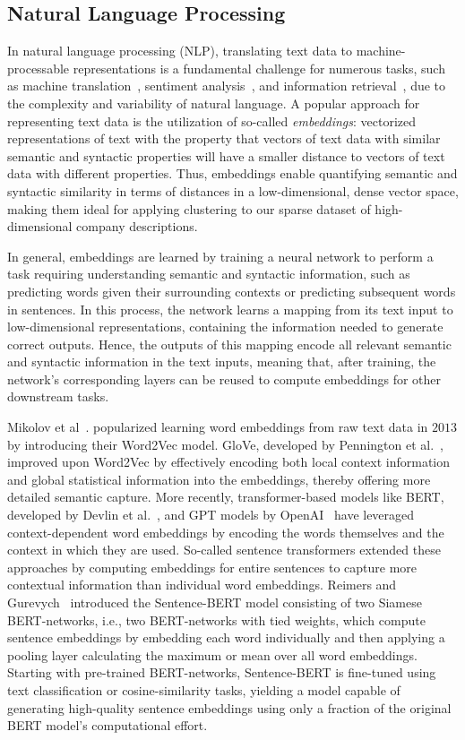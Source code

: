 \documentclass[conference]{IEEEtran}
\begin{document}
\subsection{Natural Language Processing}

In natural language processing (NLP), translating text data to machine-processable representations is a fundamental challenge for numerous tasks, such as machine translation~\cite{qi2018and}, sentiment analysis~\cite{rezaeinia2019sentiment}, and information retrieval~\cite{ye2016word}, due to the complexity and variability of natural language. A popular approach for representing text data is the utilization of so-called \emph{embeddings}: vectorized representations of text with the property that vectors of text data with similar semantic and syntactic properties will have a smaller distance to vectors of text data with different properties. Thus, embeddings enable quantifying semantic and syntactic similarity in terms of distances in a low-dimensional, dense vector space, making them ideal for applying clustering to our sparse dataset of high-dimensional company descriptions.  

In general, embeddings are learned by training a neural network to perform a task requiring understanding semantic and syntactic information, such as predicting words given their surrounding contexts or predicting subsequent words in sentences. In this process, the network learns a mapping from its text input to low-dimensional representations, containing the information needed to generate correct outputs. Hence, the outputs of this mapping encode all relevant semantic and syntactic information in the text inputs, meaning that, after training, the network's corresponding layers can be reused to compute embeddings for other downstream tasks.

Mikolov et al~\cite{mikolov2013efficient}. popularized learning word embeddings from raw text data in $2013$ by introducing their Word2Vec model. GloVe, developed by Pennington et al.~\cite{pennington2014glove}, improved upon Word2Vec by effectively encoding both local context information and global statistical information into the embeddings, thereby offering more detailed semantic capture. More recently, transformer-based models like BERT, developed by Devlin et al.~\cite{devlin2018bert}, and GPT models by OpenAI~\cite{radford2018improving, chatgpt} have leveraged context-dependent word embeddings by encoding the words themselves and the context in which they are used. So-called sentence transformers extended these approaches by computing embeddings for entire sentences to capture more contextual information than individual word embeddings. Reimers and Gurevych~\cite{reimers2019sentence} introduced the Sentence-BERT model consisting of two Siamese BERT-networks, i.e., two BERT-networks with tied weights, which compute sentence embeddings by embedding each word individually and then applying a pooling layer calculating the maximum or mean over all word embeddings. Starting with pre-trained BERT-networks, Sentence-BERT is fine-tuned using text classification or cosine-similarity tasks, yielding a model capable of generating high-quality sentence embeddings using only a fraction of the original BERT model's computational effort.
\end{document}

